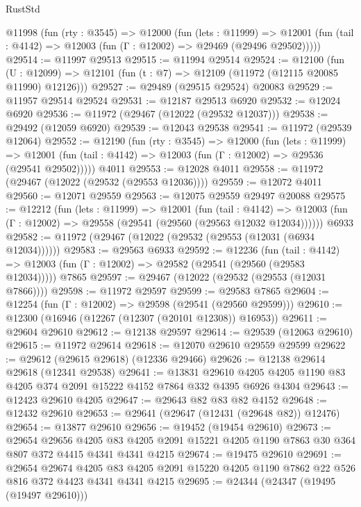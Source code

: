 \begin{lexlean}{RustStd}
\begin{coremodule}
  @11998
    (fun (rty : @3545) =>
    @12000
      (fun (lets : @11999) =>
      @12001 (fun (tail : @4142) => @12003 (fun (Γ : @12002) => @29469 (@29496 @29502)))))
@29514 := @11997 @29513
@29515 := @11994 @29514
@29524 := @12100
    (fun (U : @12099) => @12101 (fun (t : @7) => @12109 (@11972 (@12115 @20085 @11990) @12126)))
@29527 := @29489 (@29515 @29524) @20083
@29529 := @11957 @29514 @29524
@29531 := @12187 @29513 @6920
@29532 := @12024 @6920
@29536 := @11972 (@29467 (@12022 (@29532 @12037)))
@29538 := @29492 (@12059 @6920)
@29539 := @12043 @29538
@29541 := @11972 (@29539 @12064)
@29552 := @12190
    (fun (rty : @3545) =>
    @12000
      (fun (lets : @11999) =>
      @12001 (fun (tail : @4142) => @12003 (fun (Γ : @12002) => @29536 (@29541 @29502)))))
    @4011
@29553 := @12028 @4011
@29558 := @11972 (@29467 (@12022 (@29532 (@29553 @12036))))
@29559 := @12072 @4011
@29560 := @12071 @29559
@29563 := @12075 @29559 @29497 @20088
@29575 := @12212
    (fun (lets : @11999) =>
    @12001
      (fun (tail : @4142) =>
      @12003 (fun (Γ : @12002) => @29558 (@29541 (@29560 (@29563 @12032 @12034))))))
    @6933
@29582 := @11972 (@29467 (@12022 (@29532 (@29553 (@12031 (@6934 @12034))))))
@29583 := @29563 @6933
@29592 := @12236
    (fun (tail : @4142) => @12003 (fun (Γ : @12002) => @29582 (@29541 (@29560 (@29583 @12034)))))
    @7865
@29597 := @29467 (@12022 (@29532 (@29553 (@12031 @7866))))
@29598 := @11972 @29597
@29599 := @29583 @7865
@29604 := @12254 (fun (Γ : @12002) => @29598 (@29541 (@29560 @29599)))
@29610 := @12300 (@16946 (@12267 (@12307 (@20101 @12308)) @16953))
@29611 := @29604 @29610
@29612 := @12138 @29597
@29614 := @29539 (@12063 @29610)
@29615 := @11972 @29614
@29618 := @12070 @29610 @29559 @29599
@29622 := @29612 (@29615 @29618) (@12336 @29466)
@29626 := @12138 @29614 @29618 (@12341 @29538)
@29641 := @13831
    @29610
    @4205
    @4205
    @1190
    @83
    @4205
    @374
    @2091
    @15222
    @4152
    @7864
    @332
    @4395
    @6926
    @4304
@29643 := @12423 @29610 @4205
@29647 := @29643 @82 @83 @82 @4152
@29648 := @12432 @29610
@29653 := @29641 (@29647 (@12431 (@29648 @82)) @12476)
@29654 := @13877 @29610
@29656 := @19452 (@19454 @29610)
@29673 := @29654
    @29656
    @4205
    @83
    @4205
    @2091
    @15221
    @4205
    @1190
    @7863
    @30
    @364
    @807
    @372
    @4415
    @4341
    @4341
    @4215
@29674 := @19475 @29610
@29691 := @29654
    @29674
    @4205
    @83
    @4205
    @2091
    @15220
    @4205
    @1190
    @7862
    @22
    @526
    @816
    @372
    @4423
    @4341
    @4341
    @4215
@29695 := @24344 (@24347 (@19495 (@19497 @29610)))

\end{coremodule}
\end{lexlean}
